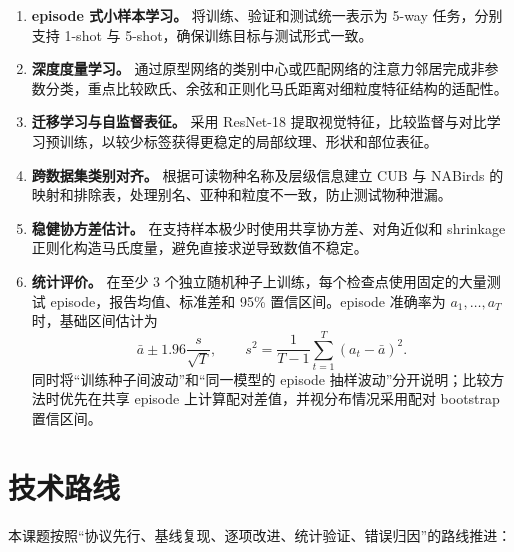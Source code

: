 \documentclass[UTF8,zihao=-4,scheme=chinese]{ctexart}
\begin{document}
\begin{enumerate}[label=\arabic*.]
  \item \textbf{episode 式小样本学习。} 将训练、验证和测试统一表示为 5-way 任务，分别支持 1-shot 与 5-shot，确保训练目标与测试形式一致。
  \item \textbf{深度度量学习。} 通过原型网络的类别中心或匹配网络的注意力邻居完成非参数分类，重点比较欧氏、余弦和正则化马氏距离对细粒度特征结构的适配性。
  \item \textbf{迁移学习与自监督表征。} 采用 ResNet-18 提取视觉特征，比较监督与对比学习预训练，以较少标签获得更稳定的局部纹理、形状和部位表征。
  \item \textbf{跨数据集类别对齐。} 根据可读物种名称及层级信息建立 CUB 与 NABirds 的映射和排除表，处理别名、亚种和粒度不一致，防止测试物种泄漏。
  \item \textbf{稳健协方差估计。} 在支持样本极少时使用共享协方差、对角近似和 shrinkage 正则化构造马氏度量，避免直接求逆导致数值不稳定。
  \item \textbf{统计评价。} 在至少 3 个独立随机种子上训练，每个检查点使用固定的大量测试 episode，报告均值、标准差和 95\% 置信区间。episode 准确率为 $a_1,\ldots,a_T$ 时，基础区间估计为
  \begin{equation}
    \bar a\pm1.96\frac{s}{\sqrt{T}},\qquad
    s^2=\frac{1}{T-1}\sum_{t=1}^{T}(a_t-\bar a)^2.
  \end{equation}
  同时将“训练种子间波动”和“同一模型的 episode 抽样波动”分开说明；比较方法时优先在共享 episode 上计算配对差值，并视分布情况采用配对 bootstrap 置信区间。
\end{enumerate}

\section{技术路线}

本课题按照“协议先行、基线复现、逐项改进、统计验证、错误归因”的路线推进：
\end{document}

